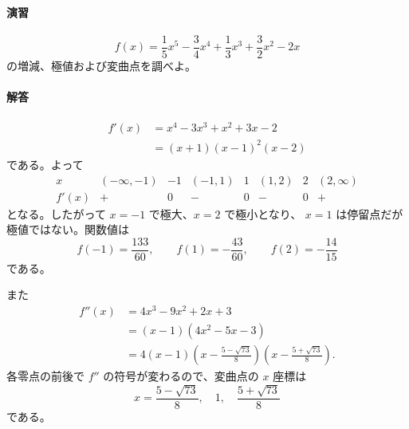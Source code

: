 \paragraph{演習}
\[
 f(x)=\frac15x^5-\frac34x^4+\frac13x^3+\frac32x^2-2x
\]
の増減、極値および変曲点を調べよ。

\paragraph{解答}
\begin{align*}
 f'(x)
 &=x^4-3x^3+x^2+3x-2\\
 &=(x+1)(x-1)^2(x-2)
\end{align*}
である。よって
\[
\begin{array}{c|ccccccc}
x&(-\infty,-1)&-1&(-1,1)&1&(1,2)&2&(2,\infty)\\ \hline
f'(x)&+&0&-&0&-&0&+
\end{array}
\]
となる。したがって $x=-1$ で極大、$x=2$ で極小となり、
$x=1$ は停留点だが極値ではない。関数値は
\[
 f(-1)=\frac{133}{60},\qquad
 f(1)=-\frac{43}{60},\qquad
 f(2)=-\frac{14}{15}
\]
である。

また
\begin{align*}
 f''(x)
 &=4x^3-9x^2+2x+3\\
 &=(x-1)(4x^2-5x-3)\\
 &=4(x-1)
 \left(x-\frac{5-\sqrt{73}}8\right)
 \left(x-\frac{5+\sqrt{73}}8\right).
\end{align*}
各零点の前後で $f''$ の符号が変わるので、変曲点の $x$ 座標は
\[
 \boxed{x=\frac{5-\sqrt{73}}8,\quad1,\quad
        \frac{5+\sqrt{73}}8}
\]
である。
